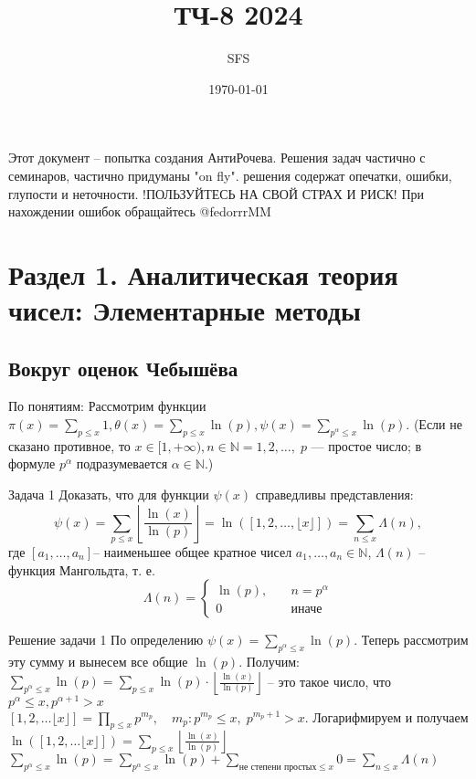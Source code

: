 \documentclass[a4paper,12pt]{article}
\title{ТЧ-8 2024}
\author{SFS}
\date{\today}
\newcommand{\TE}{\theta}
\newcommand{\AL}{\alpha}
\newcommand{\SI}{\psi}
\newcommand{\q}{\quad}
\newcommand{\bb}[1]{\mathbb{#1}}
\newcommand{\SL}{\sum\limits}
\begin{document}
\maketitle
Этот документ -- попытка создания АнтиРочева. Решения задач частично с семинаров, частично придуманы "on fly". решения содержат опечатки, ошибки, глупости и неточности. !ПОЛЬЗУЙТЕСЬ НА СВОЙ СТРАХ И РИСК!
При нахождении ошибок обращайтесь @fedorrrMM\\


\tableofcontents
\newpage
\section{Раздел 1. Аналитическая теория чисел: Элементарные методы}
\begin{mybox}{}
\subsection{Вокруг оценок Чебышёва}
По понятиям: Рассмотрим функции $\pi(x) = \SL_{p\le x} 1, \TE(x) = \SL_{p\le x}\ln(p), \SI(x) = \SL_{p^\AL\le x}\ln(p).$ (Если не сказано
противное, то $x \in [1, +\infty), n \in \bb{N} = {1, 2, …}, \;p$ — простое число; в формуле $p^\AL$ подразумевается $\AL \in \bb{N}$.)
\begin{task}{Задача 1}
Доказать, что для функции $\SI(x)$ справедливы представления:
\[\SI(x) = \SL_{p\le x} \left\lfloor \frac{\ln(x)}{\ln(p)}  \right\rfloor = \ln([1, 2,\dots, \lfloor x\rfloor]) = \SL_{n \le x}\Lambda(n),\] $\text{где }[a_1,\dots, a_n]$-- наименьшее общее кратное чисел $a_1,\dots, a_n \in \bb{N}$,  $\Lambda(n)$ -- функция Мангольдта, т. е.
\[\Lambda(n) = \begin{cases} \ln(p),\q &n = p^{\AL}\\0\q&\text{иначе} \end{cases}\]
\end{task}
\begin{sol}{Решение задачи 1}
По определению $\SI(x) = \SL_{p^\AL\le x}\ln(p).$ Теперь рассмотрим эту сумму и вынесем все общие $\ln(p)$. Получим: $\SL_{p^\AL \le x}\ln(p) = \SL_{p\le x}\ln(p) \cdot \left\lfloor \frac{\ln(x)}{\ln(p)}  \right\rfloor$ -- это такое число, что $p^\AL \le x, p^{\AL+1}>x$\\
$[1,2,\dots\lfloor x\rfloor] = \prod_{p\le x}p^{m_p},\q m_p: p^{m_p} \le x,\; p^{m_p + 1} > x.$ Логарифмируем и получаем $\ln([1,2,\dots\lfloor x\rfloor]) = \SL_{p\le x} \left\lfloor \frac{\ln(x)}{\ln(p)}  \right\rfloor$\\
$\SL_{p^\AL\le x}\ln(p) = \SL_{p^\AL\le x}\ln(p) + \SL_{\text{не степени простых} \le x} 0 = \SL_{n \le x}\Lambda(n)$
\end{sol}


\end{mybox}
\end{document}
